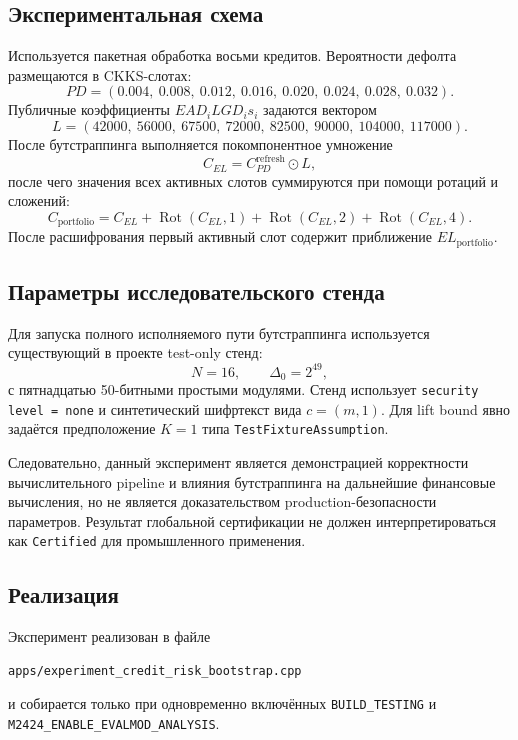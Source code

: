 \subsection{Экспериментальная схема}

Используется пакетная обработка восьми кредитов. Вероятности дефолта
размещаются в CKKS-слотах:
\[
PD =
(0.004,\ 0.008,\ 0.012,\ 0.016,\
 0.020,\ 0.024,\ 0.028,\ 0.032).
\]
Публичные коэффициенты $EAD_i LGD_i s_i$ задаются вектором
\[
L =
(42000,\ 56000,\ 67500,\ 72000,\
 82500,\ 90000,\ 104000,\ 117000).
\]
После бутстраппинга выполняется покомпонентное умножение
\[
    C_{EL}
    = C_{PD}^{\mathrm{refresh}} \odot L,
\]
после чего значения всех активных слотов суммируются при помощи ротаций и
сложений:
\[
    C_{\mathrm{portfolio}}
    =
    C_{EL}
    + \operatorname{Rot}(C_{EL},1)
    + \operatorname{Rot}(C_{EL},2)
    + \operatorname{Rot}(C_{EL},4).
\]
После расшифрования первый активный слот содержит приближение
$EL_{\mathrm{portfolio}}$.

\subsection{Параметры исследовательского стенда}

Для запуска полного исполняемого пути бутстраппинга используется существующий
в проекте test-only стенд:
\[
    N=16,\qquad
    \Delta_0 = 2^{49},
\]
с пятнадцатью 50-битными простыми модулями. Стенд использует
\texttt{security level = none} и синтетический шифртекст вида $c=(m,1)$.
Для lift bound явно задаётся предположение $K=1$ типа
\texttt{TestFixtureAssumption}.

Следовательно, данный эксперимент является демонстрацией корректности
вычислительного pipeline и влияния бутстраппинга на дальнейшие финансовые
вычисления, но не является доказательством production-безопасности
параметров. Результат глобальной сертификации не должен интерпретироваться
как \texttt{Certified} для промышленного применения.

\subsection{Реализация}

Эксперимент реализован в файле
\begin{verbatim}
apps/experiment_credit_risk_bootstrap.cpp
\end{verbatim}
и собирается только при одновременно включённых
\texttt{BUILD\_TESTING} и \texttt{M2424\_ENABLE\_EVALMOD\_ANALYSIS}.

